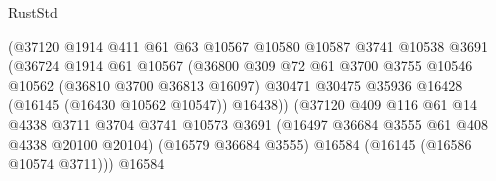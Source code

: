 \begin{lexlean}{RustStd}
\begin{coremodule}
                                            (@37120
                                              @1914
                                              @411
                                              @61
                                              @63
                                              @10567
                                              @10580
                                              @10587
                                              @3741
                                              @10538
                                              @3691
                                              (@36724
                                                @1914
                                                @61
                                                @10567
                                                (@36800
                                                  @309
                                                  @72
                                                  @61
                                                  @3700
                                                  @3755
                                                  @10546
                                                  @10562
                                                  (@36810 @3700 @36813 @16097)
                                                  @30471
                                                  @30475
                                                  @35936
                                                  @16428
                                                  (@16145 (@16430 @10562 @10547))
                                                  @16438))
                                              (@37120
                                                @409
                                                @116
                                                @61
                                                @14
                                                @4338
                                                @3711
                                                @3704
                                                @3741
                                                @10573
                                                @3691
                                                (@16497 @36684 @3555 @61 @408 @4338 @20100 @20104)
                                                (@16579 @36684 @3555)
                                                @16584
                                                (@16145 (@16586 @10574 @3711)))
                                              @16584

\end{coremodule}
\end{lexlean}
